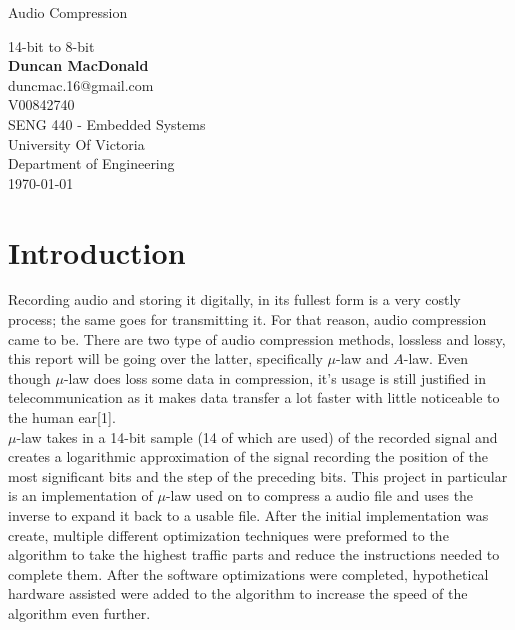\documentclass[12pt]{article}
\begin{document}
\begin{titlepage}

\begin{center}
\begin{huge}
Audio Compression\\
\end{huge}
14-bit to 8-bit\\
\vspace{1.5cm}
\textbf{Duncan MacDonald}\\
duncmac.16@gmail.com\\
V00842740\\
\vfill
SENG 440 - Embedded Systems\\
University Of Victoria\\
Department of Engineering\\
\vspace{1.5cm}
\today
\end{center}
\end{titlepage}
\newpage
\tableofcontents
\newpage
\section{Introduction}
\indent 
Recording audio and storing it digitally, in its fullest form is a very costly process; the same goes for transmitting it. For that reason, audio compression came to be. There are two type of audio compression methods, lossless and lossy, this report will be going over the latter, specifically $\mu$-law and $A$-law. Even though $\mu$-law does loss some data in compression, it's usage is still justified in telecommunication as it makes data transfer a lot faster with little noticeable to the human ear[1].\\

$\mu$-law takes in a 14-bit sample (14 of which are used) of the recorded signal and creates a logarithmic approximation of the signal recording the position of the most significant bits and the step of the preceding bits. This project in particular is an implementation of $\mu$-law used on to compress a audio file and uses the inverse to expand it back to a usable file. After the initial implementation was create, multiple different optimization techniques were preformed to the algorithm to take the highest traffic parts and reduce the instructions needed to complete them. After the software optimizations were completed, hypothetical hardware assisted were added to the algorithm to increase the speed of the algorithm even further.\\
\end{document}
